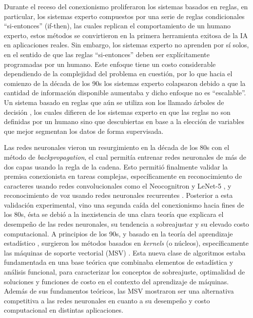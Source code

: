 Durante el receso del conexionismo proliferaron los sistemas basados en reglas, en particular, los sistemas experto compuestos por una serie de reglas condicionales “si-entonces” (if-then), las cuales replican el comportamiento de un humano experto, estos métodos se convirtieron en la primera herramienta exitosa de la IA en aplicaciones reales. Sin embargo, los sistemas experto no aprenden por sí solos, en el sentido de que las reglas “si-entonces” deben ser explícitamente programadas por un humano. Este enfoque tiene un costo considerable dependiendo de la complejidad del problema en cuestión, por lo que hacia el comienzo de la década de los 90s los sistemas experto colapsaron debido a que la cantidad de información disponible aumentaba y dicho enfoque no es “escalable”. Un sistema basado en reglas que aún se utiliza son los llamado árboles de decisión \cite{breiman_1984}, los cuales difieren de los sistemas experto en que las reglas no son definidas por un humano sino que descubiertas en base a la elección de variables que mejor segmentan los datos de forma supervisada.

Las redes neuronales vieron un resurgimiento en la década de los 80s con el método de \emph{backpropagation}, el cual permitía entrenar redes neuronales de más de dos capas usando la regla de la cadena. Esto permitió finalmente validar la premisa conexionista en tareas complejas, específicamente en reconocimiento de caracteres usando redes convolucionales como el Neocognitron \cite{fukushima_1980} y LeNet-5 \cite{lecun_1989}, y reconocimiento de voz usando redes neuronales recurrentes \cite{hopfield_1982}. Posterior a esta validación experimental, vino una segunda caída del conexionismo hacia fines de los 80s, ésta se debió a la inexistencia de una clara teoría que explicara el desempeño de las redes neuronales, su tendencia a sobreajustar y su elevado costo computacional. A principios de los 90s, y basado en la teoría del aprendizaje estadístico \cite{vapnik_1971}, surgieron los métodos basados en \emph{kernels} (o núcleos), específicamente las máquinas de soporte vectorial (MSV) \cite{boser_1992}. Esta nueva clase de algoritmos estaba fundamentada en una base teórica que combinaba elementos de estadística y análisis funcional, para caracterizar los conceptos de sobreajuste, optimalidad de soluciones y funciones de costo en el contexto del aprendizaje de máquinas. Además de sus fundamentos teóricos, las MSV mostraron ser una alternativa competitiva a las redes neuronales en cuanto a su desempeño y costo computacional en distintas aplicaciones. 

